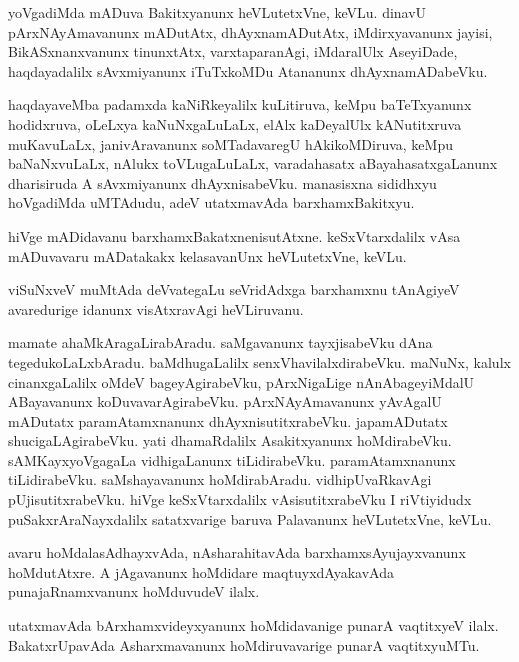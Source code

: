 \documentclass{article}
\begin{document}
\begin{mn}%
yoVgadiMda mADuva Bakitxyanunx heVLutetxVne, keVLu. dinavU
pArxNAyAmavanunx mADutAtx, dhAyxnamADutAtx, iMdirxyavanunx jayisi,
BikASxnanxvanunx tinunxtAtx, varxtaparanAgi, iMdaralUlx AseyiDade,
haqdayadalilx sAvxmiyanunx iTuTxkoMDu Atananunx dhAyxnamADabeVku.
\end{mn}

\begin{mn}%
haqdayaveMba padamxda kaNiRkeyalilx kuLitiruva, keMpu baTeTxyanunx
hodidxruva, oLeLxya kaNuNxgaLuLaLx, elAlx kaDeyalUlx kANutitxruva
muKavuLaLx, janivAravanunx soMTadavaregU hAkikoMDiruva, keMpu
baNaNxvuLaLx, nAlukx toVLugaLuLaLx, varadahasatx aBayahasatxgaLanunx
dharisiruda A sAvxmiyanunx dhAyxnisabeVku. manasisxna sididhxyu
hoVgadiMda uMTAdudu, adeV utatxmavAda barxhamxBakitxyu.
\end{mn}

\begin{mn}
hiVge mADidavanu barxhamxBakatxnenisutAtxne. keSxVtarxdalilx vAsa
mADuvavaru mADatakakx kelasavanUnx heVLutetxVne, keVLu.
\end{mn}

\begin{mn}
viSuNxveV muMtAda deVvategaLu seVridAdxga barxhamxnu tAnAgiyeV
avaredurige idanunx visAtxravAgi heVLiruvanu.
\end{mn}

\begin{mn}%
mamate ahaMkAragaLirabAradu. saMgavanunx tayxjisabeVku dAna
tegedukoLaLxbAradu. baMdhugaLalilx senxVhavilalxdirabeVku. maNuNx,
kalulx cinanxgaLalilx oMdeV bageyAgirabeVku, pArxNigaLige
nAnAbageyiMdalU ABayavanunx koDuvavarAgirabeVku. pArxNAyAmavanunx
yAvAgalU mADutatx paramAtamxnanunx dhAyxnisutitxrabeVku. japamADutatx
shucigaLAgirabeVku. yati dhamaRdalilx Asakitxyanunx
hoMdirabeVku. sAMKayxyoVgagaLa vidhigaLanunx
tiLidirabeVku. paramAtamxnanunx tiLidirabeVku. saMshayavanunx
hoMdirabAradu. vidhipUvaRkavAgi pUjisutitxrabeVku. hiVge
keSxVtarxdalilx vAsisutitxrabeVku I riVtiyidudx puSakxrAraNayxdalilx
satatxvarige baruva Palavanunx heVLutetxVne, keVLu.
\end{mn}

\begin{mn}
avaru hoMdalasAdhayxvAda, nAsharahitavAda barxhamxsAyujayxvanunx
hoMdutAtxre. A jAgavanunx hoMdidare maqtuyxdAyakavAda
punajaRnamxvanunx hoMduvudeV ilalx.
\end{mn}

\begin{mn}
utatxmavAda bArxhamxvideyxyanunx hoMdidavanige punarA vaqtitxyeV
ilalx. BakatxrUpavAda Asharxmavanunx hoMdiruvavarige punarA vaqtitxyuMTu.
\end{mn}
\end{document}
